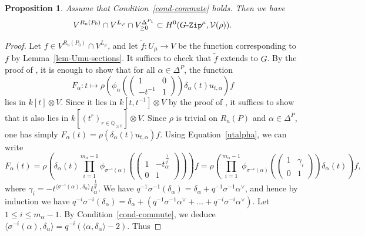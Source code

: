 \documentclass[11pt]{amsart}
\numberwithin{equation}{section}
\newtheorem{proposition}[theorem]{Proposition}
\theoremstyle{definition}
\theoremstyle{remark}
\newcommand{\GZip}{\mathop{\text{$G$-{\tt Zip}}}\nolimits}
\newcommand{\Vcal}{{\mathcal V}}
\begin{document}
\begin{proposition}\label{prop-RuP0}
Assume that Condition~\ref{cond-commute} holds. Then we have
\begin{equation}
V^{R_{\textrm{u}}(P_0)} \cap V^{L_\varphi} \cap V^{\Delta^{P_1}}_{\geq 0} \subset H^0(\GZip^\mu,\Vcal(\rho)).
\end{equation}
\end{proposition}

\begin{proof}
Let $f\in V^{R_{\textrm{u}}(P_0)} \cap V^{L_\varphi} $, and let $\widetilde{f}\colon U_\mu\to V$ be the function corresponding to $f$ by Lemma~\ref{lem-Umu-sections}. It suffices to check that $\widetilde{f}$ extends to $G$. By the proof of \cite[Theorem 3.4.1]{Imai-Koskivirta-vector-bundles}, it is enough to show that for all $\alpha\in \Delta^P$, the function
\begin{equation}
    F_{\alpha}\colon t\longmapsto \rho \left( \phi_\alpha \left(\left(\begin{matrix}
    1 & 0 \\ -t^{-1} & 1
    \end{matrix} \right)\right)\delta_\alpha(t)u_{t,\alpha} \right)f
\end{equation}
lies in $k[t]\otimes V$. Since it lies in $k[t,t^{-1}]\otimes V$ by the proof of \cite[Theorem 3.4.1]{Imai-Koskivirta-vector-bundles}, it suffices to show that it also lies in $k[(t^r)_{r \in \mathbb{Q}_{\geq 0}}]\otimes V$. 
Since $\rho$ is trivial on $R_{\textrm{u}}(P)$ and $\alpha \in \Delta^P$, one has simply $F_\alpha(t)=\rho (\delta_\alpha(t)u_{t,\alpha})f$. Using Equation~\eqref{utalpha}, we can write
\begin{equation}
  F_\alpha(t)= \rho \left(\delta_\alpha(t) \prod_{i=1}^{m_{\alpha}-1} \phi_{\sigma^{-i}(\alpha)} 
 \left( \begin{pmatrix}
1&-t_{\alpha}^{\frac{1}{q^i}}\\0&1
\end{pmatrix} \right) \right)f  = \rho \left( \prod_{i=1}^{m_{\alpha}-1} \phi_{\sigma^{-i}(\alpha)} 
 \left( \begin{pmatrix}
1&\gamma_i\\0&1
\end{pmatrix} \right) \delta_\alpha(t) \right) f, 
\end{equation}
where $\gamma_i=-t^{\langle \sigma^{-i}(\alpha), \delta_\alpha\rangle } t_{\alpha}^{\frac{1}{q^i}}$. We have $q^{-1}\sigma^{-1}(\delta_\alpha)=\delta_\alpha+q^{-1}\sigma^{-1}\alpha^\vee$, and hence by induction we have $q^{-i}\sigma^{-i}(\delta_\alpha)=\delta_\alpha+(q^{-1}\sigma^{-1}\alpha^\vee + \dots +q^{-i}\sigma^{-i}\alpha^\vee)$. Let $1\leq i \leq m_\alpha-1$. By Condition~\ref{cond-commute}, we deduce $\langle \sigma^{-i}(\alpha),\delta_\alpha \rangle=q^{-i}(\langle \alpha, \delta_\alpha \rangle-2)$. Thus

\end{proof}
\end{document}
